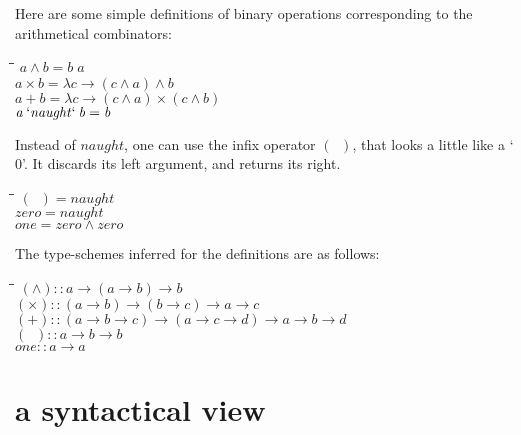 \documentclass{article}
\newlength{\lwidth}\setlength{\lwidth}{4.5cm}
\newlength{\cwidth}\setlength{\cwidth}{8mm} %
\newcommand{\Varid}[1]{\mathit{#1}}
\begin{document}
Here are some simple definitions of binary operations corresponding to the 
arithmetical combinators: 
\begin{tabbing}
\qquad\=\hspace{\lwidth}\=\hspace{\cwidth}\=\+\kill
${\Varid{a}\wedge\Varid{b}\mathrel{=}\Varid{b}\;\Varid{a}}$\\
${\Varid{a}\times\Varid{b}\mathrel{=}\lambda \Varid{c}\to (\Varid{c}\wedge\Varid{a})\wedge\Varid{b}}$\\
${\Varid{a}\mathbin{+}\Varid{b}\mathrel{=}\lambda \Varid{c}\to (\Varid{c}\wedge\Varid{a})\times(\Varid{c}\wedge\Varid{b})}$\\
${\Varid{a}\mathbin{`\Varid{naught}`}\Varid{b}\mathrel{=}\Varid{b}}$
\end{tabbing}
Instead of \ensuremath{\Varid{naught}}, one can use the infix operator \ensuremath{(\!\mathop{{}^{{}^{\cdot}}}\!)}, that looks
a little like a `\ensuremath{\mathrm{0}}'. It discards its left argument, and returns its right. 
\begin{tabbing}
\qquad\=\hspace{\lwidth}\=\hspace{\cwidth}\=\+\kill
${(\!\mathop{{}^{{}^{\cdot}}}\!)\mathrel{=}\Varid{naught}}$\\
${\Varid{zero}\mathrel{=}\Varid{naught}}$\\
${\Varid{one}\mathrel{=}\Varid{zero}\wedge\Varid{zero}}$
\end{tabbing}
The type-schemes inferred for the definitions are as follows:
\begin{tabbing}
\qquad\=\hspace{\lwidth}\=\hspace{\cwidth}\=\+\kill
${(\wedge)\mathbin{::}\Varid{a}\to (\Varid{a}\to \Varid{b})\to \Varid{b}}$\\
${(\times)\mathbin{::}(\Varid{a}\to \Varid{b})\to (\Varid{b}\to \Varid{c})\to \Varid{a}\to \Varid{c}}$\\
${(\mathbin{+})\mathbin{::}(\Varid{a}\to \Varid{b}\to \Varid{c})\to (\Varid{a}\to \Varid{c}\to \Varid{d})\to \Varid{a}\to \Varid{b}\to \Varid{d}}$\\
${(\!\mathop{{}^{{}^{\cdot}}}\!)\mathbin{::}\Varid{a}\to \Varid{b}\to \Varid{b}}$\\
${\Varid{one}\mathbin{::}\Varid{a}\to \Varid{a}}$
\end{tabbing}
\section{a syntactical view}
\end{document}
